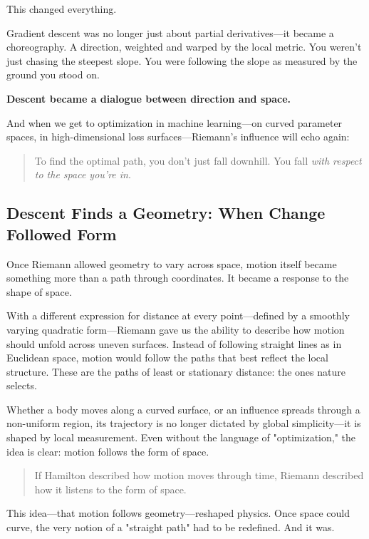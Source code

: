 This changed everything.

Gradient descent was no longer just about partial derivatives—it became a choreography. A direction, weighted and warped by the local metric. You weren’t just chasing the steepest slope. You were following the slope as measured by the ground you stood on.

\textbf{Descent became a dialogue between direction and space.}

And when we get to optimization in machine learning—on curved parameter spaces, in high-dimensional loss surfaces—Riemann’s influence will echo again:

\begin{quote}
To find the optimal path, you don’t just fall downhill.  
You fall \textit{with respect to the space you’re in}.
\end{quote}



\subsection{Descent Finds a Geometry: When Change Followed Form}

Once Riemann allowed geometry to vary across space, motion itself became something more than a path through coordinates. It became a response to the shape of space.

With a different expression for distance at every point—defined by a smoothly varying quadratic form—Riemann gave us the ability to describe how motion should unfold across uneven surfaces. Instead of following straight lines as in Euclidean space, motion would follow the paths that best reflect the local structure. These are the paths of least or stationary distance: the ones nature selects.

Whether a body moves along a curved surface, or an influence spreads through a non-uniform region, its trajectory is no longer dictated by global simplicity—it is shaped by local measurement. Even without the language of "optimization," the idea is clear: motion follows the form of space.

\begin{quote}
If Hamilton described how motion moves through time,  
Riemann described how it listens to the form of space.
\end{quote}

This idea—that motion follows geometry—reshaped physics. Once space could curve, the very notion of a "straight path" had to be redefined. And it was.

